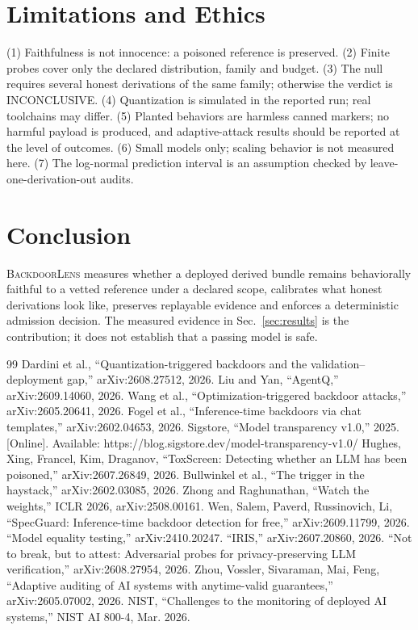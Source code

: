 \IfFileExists{IEEEtran.cls}{\documentclass[conference]{IEEEtran}\newcommand{\hasieee}{1}}{\documentclass[10pt,twocolumn]{article}\newcommand{\hasieee}{0}}
\newcommand{\bl}{\textsc{BackdoorLens}}
\begin{document}
\section{Limitations and Ethics}
(1) Faithfulness is not innocence: a poisoned reference is preserved. (2) Finite probes cover only the declared distribution, family and budget. (3) The null requires several honest derivations of the same family; otherwise the verdict is INCONCLUSIVE. (4) Quantization is simulated in the reported run; real toolchains may differ. (5) Planted behaviors are harmless canned markers; no harmful payload is produced, and adaptive-attack results should be reported at the level of outcomes. (6) Small models only; scaling behavior is not measured here. (7) The log-normal prediction interval is an assumption checked by leave-one-derivation-out audits.

\section{Conclusion}
\bl{} measures whether a deployed derived bundle remains behaviorally faithful to a vetted reference under a declared scope, calibrates what honest derivations look like, preserves replayable evidence and enforces a deterministic admission decision. The measured evidence in Sec.~\ref{sec:results} is the contribution; it does not establish that a passing model is safe.

\begin{thebibliography}{99}
 Dardini et al., ``Quantization-triggered backdoors and the validation--deployment gap,'' arXiv:2608.27512, 2026.
 Liu and Yan, ``AgentQ,'' arXiv:2609.14060, 2026.
 Wang et al., ``Optimization-triggered backdoor attacks,'' arXiv:2605.20641, 2026.
 Fogel et al., ``Inference-time backdoors via chat templates,'' arXiv:2602.04653, 2026.
 Sigstore, ``Model transparency v1.0,'' 2025. [Online]. Available: https://blog.sigstore.dev/model-transparency-v1.0/
 Hughes, Xing, Francel, Kim, Draganov, ``ToxScreen: Detecting whether an LLM has been poisoned,'' arXiv:2607.26849, 2026.
 Bullwinkel et al., ``The trigger in the haystack,'' arXiv:2602.03085, 2026.
 Zhong and Raghunathan, ``Watch the weights,'' ICLR 2026, arXiv:2508.00161.
 Wen, Salem, Paverd, Russinovich, Li, ``SpecGuard: Inference-time backdoor detection for free,'' arXiv:2609.11799, 2026.
 ``Model equality testing,'' arXiv:2410.20247.
 ``IRIS,'' arXiv:2607.20860, 2026.
 ``Not to break, but to attest: Adversarial probes for privacy-preserving LLM verification,'' arXiv:2608.27954, 2026.
 Zhou, Vossler, Sivaraman, Mai, Feng, ``Adaptive auditing of AI systems with anytime-valid guarantees,'' arXiv:2605.07002, 2026.
 NIST, ``Challenges to the monitoring of deployed AI systems,'' NIST AI 800-4, Mar. 2026.
\end{thebibliography}
\end{document}
